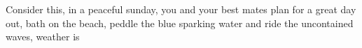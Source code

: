 Consider this, in a peaceful sunday, you and your best mates plan for a great day out, bath on the beach, peddle the blue sparking water and ride the uncontained waves, weather is 